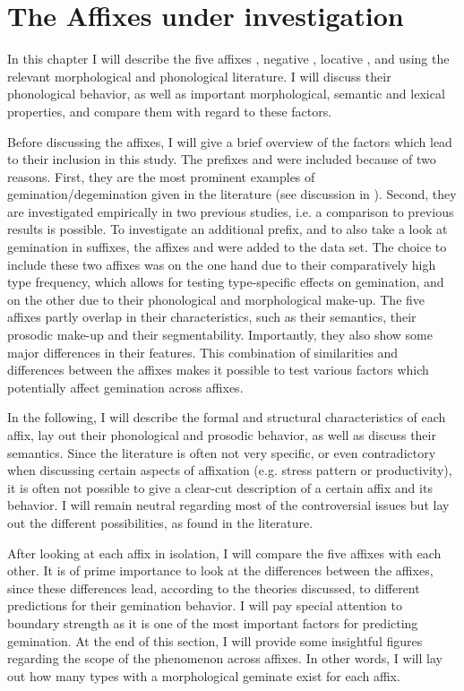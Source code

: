 
\chapter{The Affixes under investigation}{\label{affixes}}


In this chapter I will describe the five affixes , negative , locative ,  and  using the relevant morphological and phonological literature. I will discuss their phonological behavior, as well as important morphological, semantic and lexical properties, and compare them with regard to these factors.

Before discussing the affixes, I will give a brief overview of the factors which lead to their inclusion in this study.
The prefixes  and  were included because of two reasons.
First, they are the most prominent examples of gemination/degemination given in the literature (see discussion in ).  Second, they are investigated empirically in two previous studies, i.e. a comparison to previous results is possible. 
To investigate an additional prefix, and to also take a look at gemination in suffixes, the affixes  and   were added to the data set. The choice to include these two affixes was on the one hand due to their comparatively high type frequency, which allows for testing type-specific effects on gemination, and  on the other due to their phonological and morphological make-up.
The five affixes partly overlap in their characteristics, such as their semantics, their prosodic make-up and their segmentability. Importantly, they also show some major differences in their features. This combination of similarities and differences between the affixes makes it possible to test various factors which potentially affect gemination across affixes.

In the following, I will describe the formal and structural characteristics of each affix, lay out their phonological and prosodic behavior, as well as discuss their semantics. Since the literature is often not very specific, or even contradictory when discussing certain aspects of affixation (e.g. stress pattern or productivity), it is often not possible to give a clear-cut description of a certain affix and its behavior. I will remain neutral regarding most of the controversial issues but lay out the different possibilities, as found in the literature.  

After looking at each affix in isolation, I will compare the five affixes with each other. It is of prime importance to look at the differences between the affixes, since these differences lead, according to the theories discussed, to different predictions for their gemination behavior. I will pay special attention to boundary strength as it is one of the most important factors for predicting gemination.  
At the end of this section, I will provide some insightful figures regarding the scope of the phenomenon across affixes. In other words, I will lay out how many types with a morphological geminate exist for each affix.

